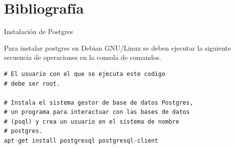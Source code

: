 \documentclass[12pt]{article}
\begin{document}
    
    

    
    
    \newpage
    \section{Bibliografía}

    \renewcommand{\section}[2]{} %

    
    
    
    \newpage
	\section{Anexos}
	
		\subsubsection{Instalación de Postgres}
		
	Para instalar postgres en Debian GNU/Linux se deben ejecutar la siguiente secuencia de operaciones en la consola de comandos.
	
\begin{lstlisting}[breaklines=true, 
				   language=SQL,  
				   title=asd, 
				   caption=Instalacion de postgres,
				   label=fig:instalar_postgres]
# El usuario con el que se ejecuta este codigo 
# debe ser root.

# Instala el sistema gestor de base de datos Postgres, 
# un programa para interactuar con las bases de datos 
# (psql) y crea un usuario en el sistema de nombre 
# postgres.
apt-get install postgresql postgresql-client	

\end{lstlisting}
\end{document}
